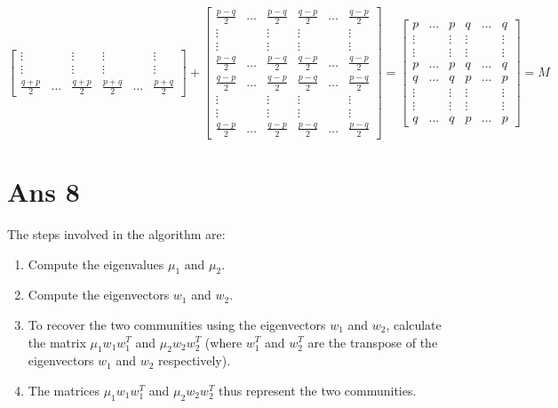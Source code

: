 \documentclass[10pt]{article}
\begin{document}
\begin{flushleft}
$$\begin{bmatrix}
\vdots & & \vdots & \vdots & & \vdots\\
\vdots & & \vdots & \vdots & & \vdots\\
\frac{q+p}{2} & \hdots & \frac{q+p}{2} & \frac{p+q}{2} & \hdots & \frac{p+q}{2}
\end{bmatrix}
+
\begin{bmatrix} 
\frac{p-q}{2} & \hdots & \frac{p-q}{2} & \frac{q-p}{2}& \hdots & \frac{q-p}{2}\\
\vdots & & \vdots & \vdots & & \vdots\\
\vdots & & \vdots & \vdots & & \vdots\\
\frac{p-q}{2} & \hdots & \frac{p-q}{2} & \frac{q-p}{2} & \hdots & \frac{q-p}{2}\\
\frac{q-p}{2} & \hdots & \frac{q-p}{2} & \frac{p-q}{2} & \hdots & \frac{p-q}{2}\\ 
\vdots & & \vdots & \vdots & & \vdots\\
\vdots & & \vdots & \vdots & & \vdots\\
\frac{q-p}{2} & \hdots & \frac{q-p}{2} & \frac{p-q}{2} & \hdots & \frac{p-q}{2}
\end{bmatrix}
=
\begin{bmatrix} 
p & \hdots & p & q & \hdots & q\\
\vdots & & \vdots & \vdots & & \vdots\\
\vdots & & \vdots & \vdots & & \vdots\\
p & \hdots & p & q & \hdots & q\\
q & \hdots & q & p & \hdots & p\\ 
\vdots & & \vdots & \vdots & & \vdots\\
\vdots & & \vdots & \vdots & & \vdots\\
q & \hdots & q & p & \hdots & p
\end{bmatrix}
 = M
$$
\end{flushleft}
\section*{Ans 8}
\begin{flushleft}
The steps involved in the algorithm are:\\
\begin{enumerate}
\item Compute the eigenvalues $\mu_{1}$ and $\mu_{2}$.
\item Compute the eigenvectors $w_{1}$ and $w_{2}$.
\item To recover the two communities using the eigenvectors $w_{1}$ and $w_{2}$, calculate the matrix $\mu_{1}w_{1}w_{1}^{T}$ and $\mu_{2}w_{2}w_{2}^{T}$ (where $w_{1}^{T}$ and $w_{2}^{T}$ are the transpose of the eigenvectors $w_{1}$ and $w_{2}$ respectively).
\item The matrices $\mu_{1}w_{1}w_{1}^{T}$ and $\mu_{2}w_{2}w_{2}^{T}$ thus represent the two communities.
\end{enumerate}
\end{flushleft}
\end{document}

